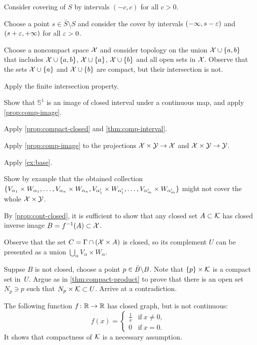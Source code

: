 \begin{multicols}{2}
Consider covering of $S$ by intervals $(-c,c)$ for all $c>0$.

Choose a point $s\in\bar S\setminus S$ and consider the cover by intervals $(-\infty, s-\varepsilon)$ and $(s+\varepsilon,+\infty)$ for all $\varepsilon>0$.

Choose a noncompact space $\mathcal{X}$ and consider topology on the union $\mathcal{X}\cup\{a,b\}$ that includes
$\mathcal{X}\cup\{a,b\}$, $\mathcal{X}\cup\{a\}$, $\mathcal{X}\cup\{b\}$ and all open sets in $\mathcal{X}$.
Observe that the sets $\mathcal{X}\cup\{a\}$ and $\mathcal{X}\cup\{b\}$ are compact, but their intersection is not.

 Apply the finite intersection property.

Show that $\mathbb{S}^1$ is an image of closed interval under a continuous map, and apply \ref{prop:comp-image}.

Apply \ref{prop:compact-closed} and \ref{thm:comp-interval}.

Apply \ref{prop:comp-image} to the projections $\mathcal{X}\times\mathcal{Y}\to\mathcal{X}$ and $\mathcal{X}\times\mathcal{Y}\to\mathcal{Y}$.

 Apply \ref{ex:base}.

Show by example that the obtained collection 
$\{V_{\alpha_1}\times W_{\alpha_1},\z\dots,V_{\alpha_n}\z\times W_{\alpha_n},V_{\alpha_1'}\z\times W_{\alpha_1'},\z\dots,V_{\alpha_m'}\z\times W_{\alpha_m'}\}$
might not cover the whole $\mathcal{X}\times\mathcal{Y}$.

By \ref{prop:cont-closed}, it is sufficient to show that any closed set $A\subset\mathcal{K}$ has closed inverse image $B=f^{-1}(A)\subset\mathcal{X}$.

Observe that the set $C=\Gamma\cap (\mathcal{X}\times A)$ is closed,
so its complement $U$ can be presented as a union $\bigcup_\alpha V_\alpha\times W_\alpha$.

Suppse $B$ is not closed, choose a point $p\z\in \bar B\backslash B$.
Note that $\{p\}\times \mathcal{K}$ is a compact set in~$U$.
Argue as in \ref{thm:compact-product} to prove that there is an open set $N_p\ni p$ such that $N_p\times \mathcal{K}\subset U$.
Arrive at a contradiction.

The following function $f\colon\mathbb{R}\to\mathbb{R}$ has closed graph, but is not continuous:
\[f(x)=
\begin{cases}
\tfrac1x&\text{if}\ x\ne 0,
\\
0&\text{if}\ x= 0.
\end{cases}
\]
It shows that compactness of $\mathcal{K}$ is a necessary assumption.


\end{multicols}
